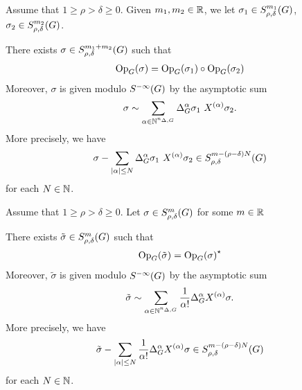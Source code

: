 \begin{theorem}
\label{theorem:composition_formula}
    Assume that $1 \geq \rho > \delta \geq 0$.
    Given $m_1, m_2 \in \mathbb{R}$,
    we let
    $\sigma_1 \in S^{m_1}_{\rho, \delta}(G)$,
    $\sigma_2 \in S^{m_2}_{\rho, \delta}(G)$.

    There exists $\sigma \in S^{m_1 + m_2}_{\rho, \delta}(G)$ such that
    \begin{align*}
        \mathrm{Op}_{G} (\sigma) = \mathrm{Op}_{G}(\sigma_1) \circ \mathrm{Op}_{G}(\sigma_2)
    \end{align*}
    Moreover,
    $\sigma$ is given modulo ${S^{-\infty} (G)}$ by the asymptotic sum
    \begin{align*}
        \sigma \sim
        \sum_{\alpha \in \N^{\dimDifferenceOperators}} \DifferenceOperatorOrder \alpha \sigma_1 \ \TaylorLeftDifferentialOperator \alpha \sigma_2.
    \end{align*}
    More precisely,
    we have
    \begin{align*}
        \sigma
        - \sum_{\left|{\alpha}\right| \leq N} {\Delta_{G}^{\alpha}} \sigma_1 \ X^{(\alpha)} \sigma_2 \in S^{m - (\rho - \delta) N}_{\rho, \delta}(G)
    \end{align*}
    for each $N \in \mathbb{N}$.
\end{theorem}

\begin{theorem}
\label{theorem:adjunction_formula}
    Assume that $1 \geq \rho > \delta \geq 0$.
    Let
    $\sigma \in S^{m}_{\rho, \delta}(G)$ for some $m \in \mathbb{R}$

    There exists $\tilde \sigma \in S^{m}_{\rho, \delta}(G)$ such that
    \begin{align*}
        \mathrm{Op}_{G} (\tilde \sigma) = {\mathrm{Op}_{G}(\sigma)}^\star
    \end{align*}
    Moreover,
    $\tilde \sigma$ is given modulo ${S^{-\infty} (G)}$ by the asymptotic sum
    \begin{align*}
        \tilde \sigma \sim
        \sum_{\alpha \in \mathbb{N}^{n_{\Delta, G}}} \frac 1 {\alpha!} {\Delta_{G}^{\alpha}} X^{(\alpha)} \sigma.
    \end{align*}
    More precisely,
    we have
    \begin{align*}
        \tilde \sigma
        - \sum_{\left|{\alpha}\right| \leq N} \frac 1 {\alpha!} {\Delta_{G}^{\alpha}} X^{(\alpha)} \sigma \in S^{m - (\rho - \delta) N}_{\rho, \delta}(G)
    \end{align*}
    for each $N \in \mathbb{N}$.
\end{theorem}


